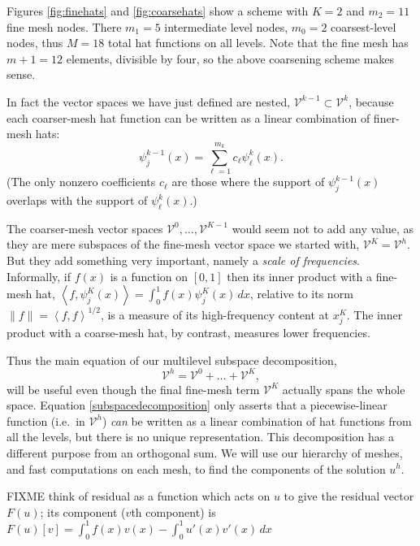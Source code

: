 \documentclass[letterpaper,final,12pt,reqno]{amsart}
\newcommand{\ip}[2]{\left<#1,#2\right>}
\begin{document}
Figures \ref{fig:finehats} and \ref{fig:coarsehats} show a scheme with $K=2$ and $m_2=11$ fine mesh nodes.  There $m_1=5$ intermediate level nodes, $m_0=2$ coarsest-level nodes, thus $M=18$ total hat functions on all levels.  Note that the fine mesh has $m+1=12$ elements, divisible by four, so the above coarsening scheme makes sense.

In fact the vector spaces we have just defined are nested, $\mathcal{V}^{k-1} \subset \mathcal{V}^k$, because each coarser-mesh hat function can be written as a linear combination of finer-mesh hats:
\begin{equation}
   \psi_j^{k-1}(x) = \sum_{\ell=1}^{m_k} c_\ell \psi_\ell^k(x). \label{hatcombination}
\end{equation}
(The only nonzero coefficients $c_\ell$ are those where the support of $\psi_j^{k-1}(x)$ overlaps with the support of $\psi_\ell^k(x)$.)

The coarser-mesh vector spaces $\mathcal{V}^0,\dots,\mathcal{V}^{K-1}$ would seem not to add any value, as they are mere subspaces of the fine-mesh vector space we started with, $\mathcal{V}^K = \mathcal{V}^h$.  But they add something very important, namely a \emph{scale of frequencies}.  Informally, if $f(x)$ is a function on $[0,1]$ then its inner product with a fine-mesh hat, $\ip{f}{\psi_j^K(x)} = \int_0^1 f(x) \psi_j^K(x)\,dx$, relative to its norm $\|f\| = \ip{f}{f}^{1/2}$, is a measure of its high-frequency content at $x_j^K$.  The inner product with a coarse-mesh hat, by contrast, measures lower frequencies.

Thus the main equation of our multilevel subspace decomposition,
\begin{equation}
  \mathcal{V}^h = \mathcal{V}^0 + \dots + \mathcal{V}^K, \label{subspacedecomposition}
\end{equation}
will be useful even though the final fine-mesh term $\mathcal{V}^K$ actually spans the whole space.  Equation \eqref{subspacedecomposition} only asserts that a piecewise-linear function (i.e.~in $\mathcal{V}^h$) \emph{can} be written as a linear combination of hat functions from all the levels, but there is no unique representation.  This decomposition has a different purpose from an orthogonal sum.  We will use our hierarchy of meshes, and fast computations on each mesh, to find the components of the solution $u^h$.


FIXME think of residual as a function which acts on $u$ to give the residual vector $F(u)$; its component ($v$th component) is $F(u)[v]=\int_0^1 f(x) v(x) - \int_0^1 u'(x)v'(x)\,dx$
\end{document}
